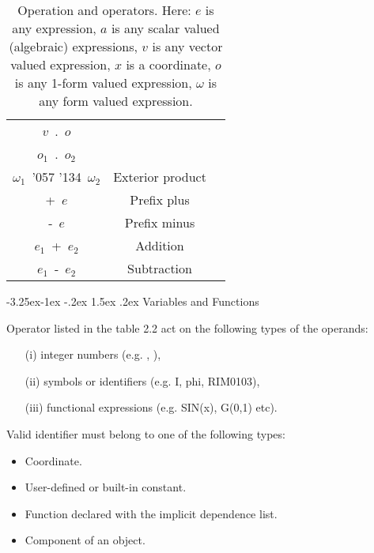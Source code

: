 \documentclass[twoside,openright]{report}
\makeatletter
\newcommand{\grgtt}{\ttfamily}
\renewcommand{\tt}{\grgtt}
\newcommand{\w}{{\tt \char'057 \char'134}}  %
\renewcommand\subsection{\@startsection{subsection}{2}{\z@}%
                                     {-3.25ex\@plus -1ex \@minus -.2ex}%
                                     {1.5ex \@plus .2ex}%
                                     {\normalfont\large\slshape\bfseries}}
\makeatother
\begin{document}
\begin{table}
\begin{center}
\begin{tabular}{|c|c|c|}
$v$\ {\tt.}\ $o$    &                         &                    \\
$o_1$\ {\tt.}\ $o_2$&                         &                    \\
\cline{1-2}
$\omega_1$\ \w\ $\omega_2$ & Exterior product &                    \\
\hline
{\tt +}\ $e$        & Prefix plus             &                    \\
\cline{1-2}
{\tt -}\ $e$        & Prefix minus            &                    \\
\cline{1-2}
$e_1$\ {\tt +}\ $e_2$ & Addition              &                    \\
\cline{1-2}
$e_1$\ {\tt -}\ $e_2$ & Subtraction           &                    \\
\hline
\end{tabular}
\end{center}
\label{operators}
\caption{Operation and operators. Here:
$e$ is any expression,
$a$ is any scalar valued (algebraic) expressions,
$v$ is any vector valued expression,
$x$ is a coordinate,
$o$ is any 1-form valued expression,
$\omega$ is any form valued expression.}
\end{table}



\subsection{Variables and Functions}

Operator listed in the table 2.2 act on
the following types of the operands:
\begin{itemize}
\item[(i)]   integer numbers (e.g. {\tt 0}, {\tt 123}),
\item[(ii)]  symbols or identifiers (e.g. {\tt I}, {\tt phi}, {\tt RIM0103}),
\item[(iii)] functional expressions (e.g. {\tt SIN(x)}, {\tt G(0,1)} etc).
\end{itemize}

Valid identifier must belong to one of the following types:
\begin{itemize}
\item Coordinate.
\item User-defined or built-in constant.
\item Function declared with the implicit dependence list.
\item Component of an object.
\end{itemize}
\end{document}
